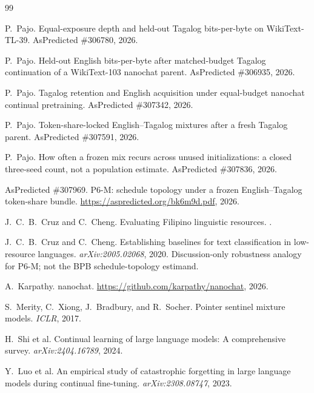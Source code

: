 \documentclass[11pt,a4paper]{article}
\begin{document}
\begin{thebibliography}{99}

P.~Pajo.
\newblock Equal-exposure depth and held-out Tagalog bits-per-byte on WikiText-TL-39.
\newblock AsPredicted \#306780, 2026.

P.~Pajo.
\newblock Held-out English bits-per-byte after matched-budget Tagalog continuation of a WikiText-103 nanochat parent.
\newblock AsPredicted \#306935, 2026.

P.~Pajo.
\newblock Tagalog retention and English acquisition under equal-budget nanochat continual pretraining.
\newblock AsPredicted \#307342, 2026.

P.~Pajo.
\newblock Token-share-locked English--Tagalog mixtures after a fresh Tagalog parent.
\newblock AsPredicted \#307591, 2026.

P.~Pajo.
\newblock How often a frozen mix recurs across unused initializations: a closed three-seed count, not a population estimate.
\newblock AsPredicted \#307836, 2026.

AsPredicted \#307969.
\newblock P6-M: schedule topology under a frozen English--Tagalog token-share bundle.
\newblock \url{https://aspredicted.org/bk6m9d.pdf}, 2026.

J.~C.~B.~Cruz and C.~Cheng.
\newblock Evaluating Filipino linguistic resources.
.

J.~C.~B.~Cruz and C.~Cheng.
\newblock Establishing baselines for text classification in low-resource languages.
\newblock \emph{arXiv:2005.02068}, 2020.
\newblock Discussion-only robustness analogy for P6-M; not the BPB schedule-topology estimand.

A.~Karpathy.
\newblock nanochat.
\newblock \url{https://github.com/karpathy/nanochat}, 2026.

S.~Merity, C.~Xiong, J.~Bradbury, and R.~Socher.
\newblock Pointer sentinel mixture models.
\newblock \emph{ICLR}, 2017.

H.~Shi et al.
\newblock Continual learning of large language models: A comprehensive survey.
\newblock \emph{arXiv:2404.16789}, 2024.

Y.~Luo et al.
\newblock An empirical study of catastrophic forgetting in large language models during continual fine-tuning.
\newblock \emph{arXiv:2308.08747}, 2023.


\end{thebibliography}
\end{document}
